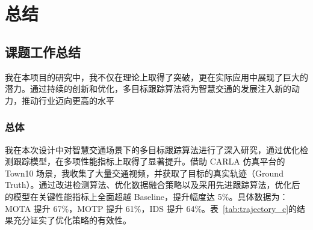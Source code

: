 \chapter{总结}


\section{课题工作总结}

我在本项目的研究中，我不仅在理论上取得了突破，更在实际应用中展现了巨大的潜力。通过持续的创新和优化，多目标跟踪算法将为智慧交通的发展注入新的动力，推动行业迈向更高的水平

\subsection{总体}


我在本次设计中对智慧交通场景下的多目标跟踪算法进行了深入研究，通过优化检测跟踪模型，在多项性能指标上取得了显著提升。借助 CARLA 仿真平台的 Town10 场景，我收集了大量交通视频，并获取了目标的真实轨迹（Ground Truth）。通过改进检测算法、优化数据融合策略以及采用先进跟踪算法，优化后的模型在关键性能指标上全面超越 Baseline，提升幅度达 5\%。具体数据为：MOTA 提升 67\%，MOTP 提升 61\%，IDS 提升 64\%。表~\ref{tab:trajectory_c}的结果充分证实了优化策略的有效性。

